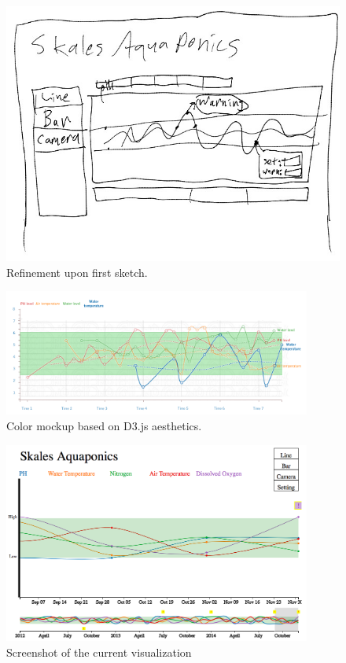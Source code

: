 \documentclass{sigchi}
\begin{document}
\begin{figure}[!h]
\centering
\includegraphics[width=0.9\columnwidth]{Sketch2}
\caption{Refinement upon first sketch.}
\label{fig:sketch2}
\end{figure}

\begin{figure}
\centering
\includegraphics[width=0.9\textwidth]{Mockup}
\caption{Color mockup based on D3.js aesthetics.}
\label{fig:mockup}
\end{figure}

\begin{figure}
\centering
\includegraphics[width=0.9\textwidth]{Visualization_Screenshot}
\caption{Screenshot of the current visualization}
\label{fig:visualization}
\end{figure}
\end{document}
